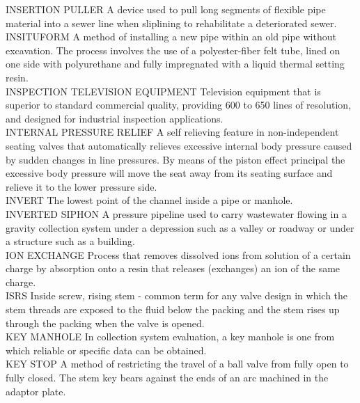 \documentclass{article}
\begin{document}
INSERTION PULLER
A device used to pull long segments of flexible pipe material into a sewer line when sliplining to rehabilitate a deteriorated sewer. 
\vspace{0.3cm}\\
INSITUFORM
A method of installing a new pipe within an old pipe without excavation. The process involves the use of a polyester-fiber felt tube, lined on one side with polyurethane and fully impregnated with a liquid thermal setting resin. 
\vspace{0.3cm}\\
INSPECTION TELEVISION EQUIPMENT
Television equipment that is superior to standard commercial quality, providing 600 to 650 lines of resolution, and designed for industrial inspection applications. 
\vspace{0.3cm}\\
INTERNAL PRESSURE RELIEF
A self relieving feature in non-independent seating valves that automatically relieves excessive internal body pressure caused by sudden changes in line pressures. By means of the piston effect principal the excessive body pressure will move the seat away from its seating surface and relieve it to the lower pressure side.
\vspace{0.3cm}\\
INVERT
The lowest point of the channel inside a pipe or manhole. 
\vspace{0.3cm}\\
INVERTED SIPHON
A pressure pipeline used to carry wastewater flowing in a gravity collection system under a depression such as a valley or roadway or under a structure such as a building.
\vspace{0.3cm}\\
ION EXCHANGE
Process that removes dissolved ions from solution of a certain charge by absorption onto a resin that releases (exchanges) an ion of the same charge.
\vspace{0.3cm}\\
ISRS
Inside screw, rising stem - common term for any valve design in which the stem threads are exposed to the fluid below the packing and the stem rises up through the packing when the valve is opened.
\vspace{0.3cm}\\
KEY MANHOLE
In collection system evaluation, a key manhole is one from which reliable or specific data can be obtained. 
\vspace{0.3cm}\\
KEY STOP
A method of restricting the travel of a ball valve from fully open to fully closed. The stem key bears against the ends of an arc machined in the adaptor plate.
\end{document}
